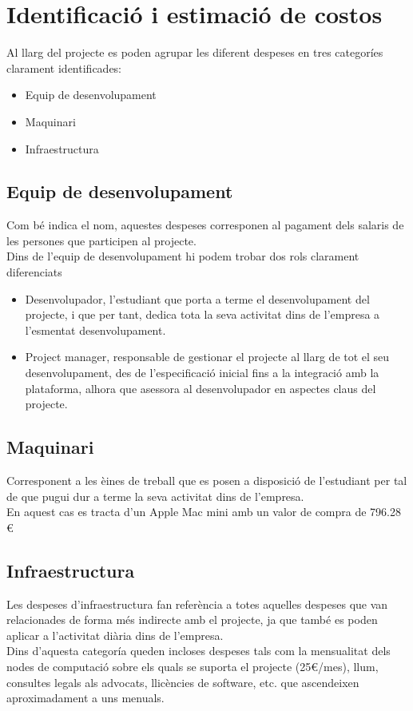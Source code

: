 \section{Identificació i estimació de costos}
Al llarg del projecte es poden agrupar les diferent despeses en tres categoríes clarament identificades:
\begin{itemize}
	\item Equip de desenvolupament
	\item Maquinari
	\item Infraestructura
\end{itemize}

\subsection{Equip de desenvolupament}
Com bé indica el nom, aquestes despeses corresponen al pagament dels salaris de les persones que participen al projecte.\\
Dins de l'equip de desenvolupament hi podem trobar dos rols clarament diferenciats
\begin{itemize}
	\item Desenvolupador, l'estudiant que porta a terme el desenvolupament del projecte, i que per tant, dedica tota la seva activitat dins de l'empresa a l'esmentat desenvolupament.
	\item Project manager, responsable de gestionar el projecte al llarg de tot el seu desenvolupament, des de l'especificació inicial fins a la integració amb la plataforma, alhora que asessora al desenvolupador en aspectes claus del projecte. 
\end{itemize}

\subsection{Maquinari}
Corresponent a les èines de treball que es posen a disposició de l'estudiant per tal de que pugui dur a terme la seva activitat dins de l'empresa. \\
En aquest cas es tracta d'un Apple Mac mini amb un valor de compra de 796.28 \euro

\subsection{Infraestructura}
Les despeses d'infraestructura fan referència a totes aquelles despeses que van relacionades de forma més indirecte amb el projecte, ja que també es poden aplicar a l'activitat diària dins de l'empresa.\\
\newline Dins d'aquesta categoría queden incloses despeses tals com la mensualitat dels nodes de computació sobre els quals se suporta el projecte (25\euro/mes), llum, consultes legals als advocats, llicències de software, etc. que ascendeixen aproximadament a uns  menuals.


